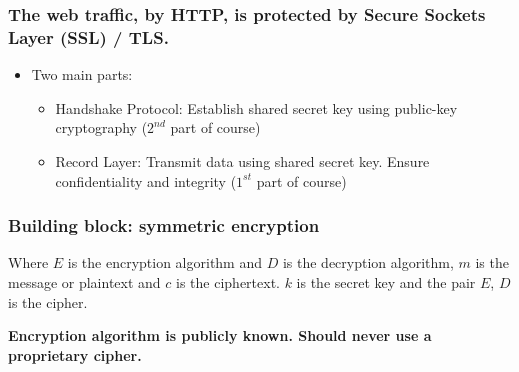 \documentclass[12pt]{book}
\begin{document}
\subsubsection{The web traffic, by HTTP, is protected by Secure Sockets Layer (SSL) / TLS.}
\begin{itemize}
	\item Two main parts:
	\begin{itemize}
		\item Handshake Protocol: Establish shared secret key using public-key cryptography ($2^{nd}$ part of course)
		\item Record Layer: Transmit data using shared secret key. Ensure confidentiality and integrity ($1^{st}$ part of course)
	\end{itemize}
\end{itemize}

\subsubsection{Building block: symmetric encryption}
\begin{center}
\end{center}Where $E$ is the encryption algorithm and $D$ is the decryption algorithm, $m$ is the message or plaintext and $c$ is the ciphertext. $k$ is the secret key and the pair $E$, $D$ is the cipher.

\textbf{Encryption algorithm is publicly known. Should never use a proprietary cipher.}
\end{document}
